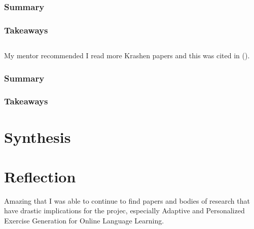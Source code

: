 \documentclass[
	letterpaper, %
]{jdf}
\newcommand{\pcite}[1]{(\cite{#1})}
\begin{document}
\subsubsection{Summary}


\subsubsection{Takeaways}

\subsection{}
My mentor recommended I read more Krashen papers and this was cited in \pcite{llm_augmented_exercise_retrieval}.

\subsubsection{Summary}


\subsubsection{Takeaways}


\section{Synthesis}


\section{Reflection}
Amazing that I was able to continue to find papers and bodies of research that have drastic implications for the projec, especially Adaptive and Personalized Exercise Generation  for Online Language Learning.
\end{document}
